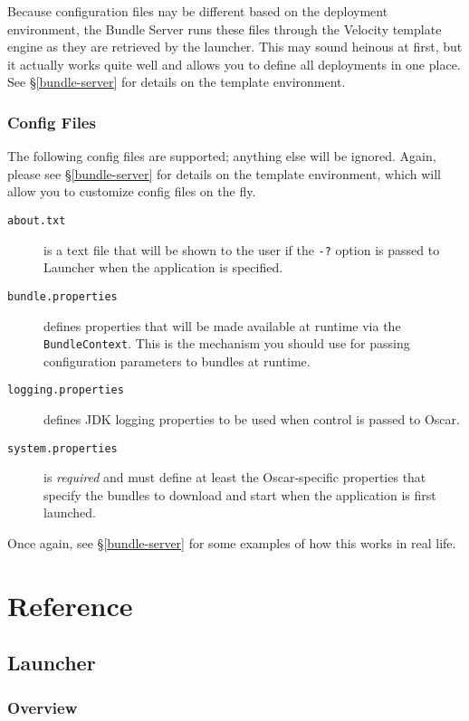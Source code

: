 \documentclass{report}
\begin{document}
\noindent Because configuration files nay be different based on the deployment environment, the Bundle Server
runs these files through the Velocity template engine as they are retrieved by the launcher. This
may sound heinous at first, but it actually works quite well and allows you to define all deployments
in one place. See \S\ref{bundle-server} for details on the template environment.

\subsection{Config Files}

The following config files are supported; anything else will be ignored. Again, please see 
\S\ref{bundle-server} for details on the template environment, which will allow you to customize
config files on the fly.

\begin{description}
\item[\tt about.txt] is a text file that will be shown to the user if the {\tt -?} option is passed
to Launcher when the application is specified. 
\item[\tt bundle.properties] defines properties that will be made available at runtime via the {\tt BundleContext}.
This is the mechanism you should use for passing configuration parameters to bundles at runtime. 
\item[\tt logging.properties] defines JDK logging properties to be used when control is passed to Oscar.
\item[\tt system.properties] is {\it required}\/ and must define at least the Oscar-specific properties 
that specify the bundles to download and start when the application is first launched.
\end{description}

\noindent Once again, see \S\ref{bundle-server} for some examples of how this works in real life.

\chapter{Reference}

\section{Launcher}
\label{launcher}

\subsection{Overview}
\end{document}
